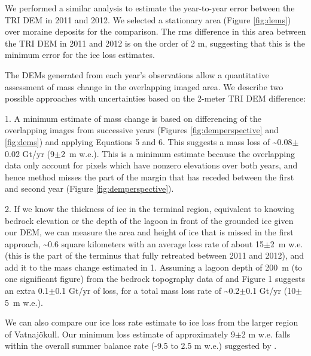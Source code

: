 \documentclass[review]{igs}
\begin{document}
We performed a similar analysis to estimate the year-to-year error between the TRI DEM in 2011 and 2012. We selected a stationary area (Figure \ref{fig:dems}) over moraine deposits for the comparison. The rms difference in this area between the TRI DEM in 2011 and 2012 is on the order of 2 m, suggesting that this is the minimum error for the ice loss estimates.

The DEMs generated from each year’s observations allow a quantitative assessment of mass change in the overlapping imaged area. We describe two possible approaches with uncertainties based on the 2-meter TRI DEM difference:

1. A minimum estimate of mass change is based on differencing of the overlapping images from successive years (Figures \ref{fig:demperspective} and \ref{fig:dems}) and applying Equations 5 and 6. This suggests a mass loss of \textasciitilde0.08$\pm$0.02 Gt/yr (9$\pm$2~m w.e.). This is a minimum estimate because the overlapping data only account for pixels which have nonzero elevations over both years, and hence method misses the part of the margin that has receded between the first and second year (Figure \ref{fig:demperspective}). 

2.  If we know the thickness of ice in the terminal region, equivalent to knowing bedrock elevation or the depth of the lagoon in front of the grounded ice given our DEM, we can measure the area and height of ice that is missed in the first approach, \textasciitilde0.6 square kilometers with an average loss rate of about 15$\pm$2~m w.e. (this is the part of the terminus that fully retreated between 2011 and 2012), and add it to the mass change estimated in 1. Assuming a lagoon depth of 200~m (to one significant figure) from the bedrock topography data of \citet{bjornsson2001jokulsarlon} and Figure 1 suggests an extra 0.1$\pm$0.1 Gt/yr of loss, for a total mass loss rate of \textasciitilde0.2$\pm$0.1 Gt/yr (10$\pm$5~m w.e.).

We can also compare our ice loss rate estimate to ice loss from the larger region of Vatnajökull. Our minimum loss estimate of approximately 9$\pm$2 m w.e. falls within the overall summer balance rate (-9.5 to 2.5 m w.e.) suggested by \citet{bjornsson2008icelandic}.

\end{document}
